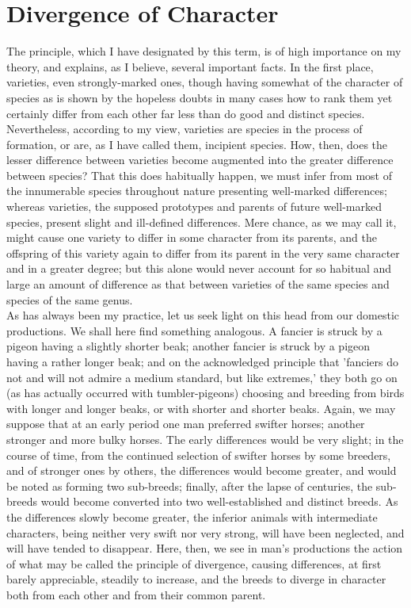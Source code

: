 \section{Divergence of Character}
\indent The principle, which I have designated by this term, is of high importance on my theory, and explains, as I believe, several important facts.  In the first place, varieties, even strongly-marked ones, though having somewhat of the character of species as is shown by the hopeless doubts in many cases how to rank them yet certainly differ from each other far less than do good and distinct species. Nevertheless, according to my view, varieties are species in the process of formation, or are, as I have called them, incipient species.  How, then, does the lesser difference between varieties become augmented into the greater difference between species? That this does habitually happen, we must infer from most of the innumerable species throughout nature presenting well-marked differences; whereas varieties, the supposed prototypes and parents of future well-marked species, present slight and ill-defined differences. Mere chance, as we may call it, might cause one variety to differ in some character from its parents, and the offspring of this variety again to differ from its parent in the very same character and in a greater degree; but this alone would never account for so habitual and large an amount of difference as that between varieties of the same species and species of the same genus. \\
\indent As has always been my practice, let us seek light on this head from our domestic productions. We shall here find something analogous. A fancier is struck by a pigeon having a slightly shorter beak; another fancier is struck by a pigeon having a rather longer beak; and on the acknowledged principle that 'fanciers do not and will not admire a medium standard, but like extremes,' they both go on (as has actually occurred with tumbler-pigeons) choosing and breeding from birds with longer and longer beaks, or with shorter and shorter beaks. Again, we may suppose that at an early period one man preferred swifter horses; another stronger and more bulky horses. The early differences would be very slight; in the course of time, from the continued selection of swifter horses by some breeders, and of stronger ones by others, the differences would become greater, and would be noted as forming two sub-breeds; finally, after the lapse of centuries, the sub-breeds would become converted into two well-established and distinct breeds. As the differences slowly become greater, the inferior animals with intermediate characters, being neither very swift nor very strong, will have been neglected, and will have tended to disappear. Here, then, we see in man's productions the action of what may be called the principle of divergence, causing differences, at first barely appreciable, steadily to increase, and the breeds to diverge in character both from each other and from their common parent. \\
